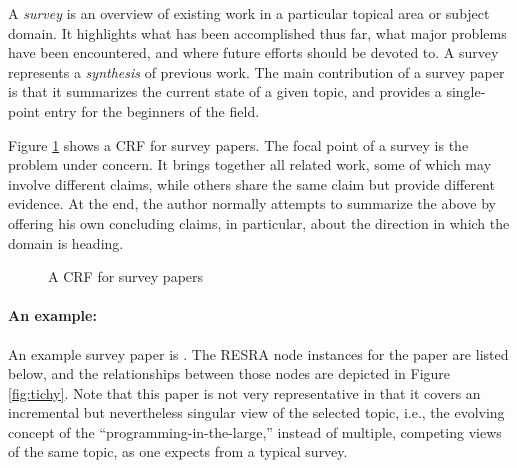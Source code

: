 A {\it survey\/} is an overview of existing work in a particular topical
area or subject domain. It highlights what has been accomplished thus far,
what major problems have been encountered, and where future efforts should
be devoted to. A survey represents a {\it synthesis\/} of previous work.
The main contribution of a survey paper is that it summarizes the current
state of a given topic, and provides a single-point entry for the
beginners of the field.

Figure \ref{fig:survey-crf} shows a CRF for survey papers. The focal
point of a survey is the problem under concern. It brings together all
related work, some of which may involve different claims, while others
share the same claim but provide different evidence. At the end, the author
normally attempts to summarize the above by offering his own concluding
claims, in particular, about the direction in which the domain is heading.

\begin{figure}[htb]
  \caption{A CRF for survey papers}
  \label{fig:survey-crf}
\end{figure}


\paragraph{An example:}

An example survey paper is \cite{Tichy92}. The RESRA node
instances for the paper are listed below, and the relationships between
those nodes are depicted in Figure \ref{fig:tichy}. Note that this paper is
not very representative in that it covers an incremental but nevertheless
singular view of the selected topic, i.e., the evolving concept of
the ``programming-in-the-large,'' instead of multiple, competing views of
the same topic, as one expects from a typical survey.

